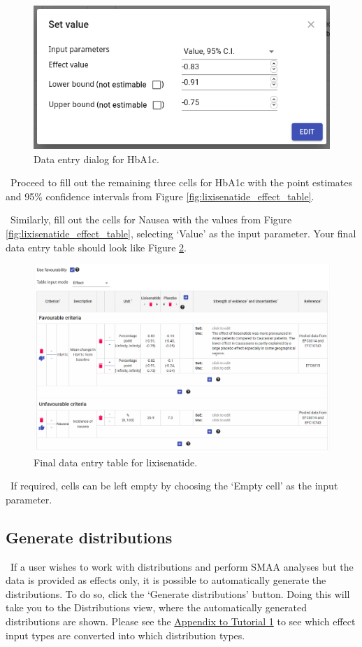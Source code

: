 \documentclass[00_mcda_tutorial.tex]{subfiles}
\begin{document}
\begin{figure}[!ht]
    \centering
    \includegraphics[width=.5\textwidth]{fig/effectsInput.png}
    \caption{Data entry dialog for HbA1c.}
    \label{fig:data1}
\end{figure}

\noindent \leftpointright \, Proceed to fill out the remaining three cells for HbA1c with the point estimates and 95\% confidence intervals from Figure \ref{fig:lixisenatide_effect_table}.
\newline

\noindent \leftpointright \, Similarly, fill out the cells for Nausea with the values from Figure \ref{fig:lixisenatide_effect_table}, selecting ‘Value’ as the input parameter. Your final data entry table should look like Figure \ref{fig:dataFinished}.

\begin{figure}[!ht]
    \centering
    \includegraphics[width=\textwidth]{fig/effectsInputDone.png}
    \caption{Final data entry table for lixisenatide.}
    \label{fig:dataFinished}
\end{figure}

\noindent \faLightbulbO \, If required, cells can be left empty by choosing the ‘Empty cell’ as the input parameter.

\subsection*{Generate distributions}
\noindent \leftpointright \, If a user wishes to work with distributions and perform SMAA analyses but the data is provided as effects only, it is possible to automatically generate the distributions. To do so, click the ‘Generate distributions’ button. Doing this will take you to the Distributions view, where the automatically generated distributions are shown. Please see the \hyperref[appendix1]{Appendix to Tutorial 1} to see which effect input types are converted into which distribution types.
\end{document}
